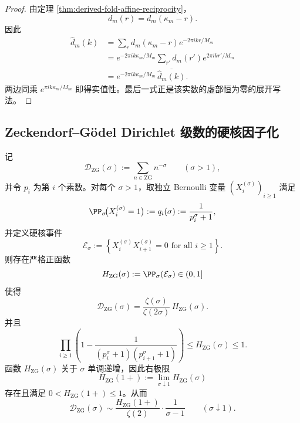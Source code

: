 \documentclass[../../../main.tex]{subfiles}
\begin{document}
\begin{proof}
由定理 \ref{thm:derived-fold-affine-reciprocity}，
\[
d_m(r)=d_m(\kappa_m-r).
\]
因此
\[
\begin{aligned}
\widehat d_m(k)
&=
\sum_{r}d_m(\kappa_m-r)e^{-2\pi i kr/M_m} \\
&=
e^{-2\pi i k\kappa_m/M_m}
\sum_{r'}d_m(r')e^{2\pi i kr'/M_m} \\
&=
e^{-2\pi i k\kappa_m/M_m}\,\overline{\widehat d_m(k)}.
\end{aligned}
\]
两边同乘 \(e^{\pi i k\kappa_m/M_m}\) 即得实值性。最后一式正是该实数的虚部恒为零的展开写法。
\end{proof}


\subsection{Zeckendorf--Gödel Dirichlet 级数的硬核因子化}

\begin{theorem}\label{thm:derived-zg-hardcore-factorization}
记
\[
\mathcal D_{\mathrm{ZG}}(\sigma):=\sum_{n\in \mathrm{ZG}}n^{-\sigma}
\qquad (\sigma>1),
\]
并令 \(p_i\) 为第 \(i\) 个素数。对每个 \(\sigma>1\)，取独立 Bernoulli 变量
\(
(X_i^{(\sigma)})_{i\ge 1}
\)
满足
\[
\PP_{\sigma}\!\bigl(X_i^{(\sigma)}=1\bigr)
:=
q_i(\sigma):=\frac{1}{p_i^{\sigma}+1},
\]
并定义硬核事件
\[
\mathcal E_{\sigma}:=
\left\{
X_i^{(\sigma)}X_{i+1}^{(\sigma)}=0
\text{ for all } i\ge 1
\right\}.
\]
则存在严格正函数
\[
H_{\mathrm{ZG}}(\sigma):=\PP_{\sigma}(\mathcal E_{\sigma})\in (0,1]
\]
使得
\[
\mathcal D_{\mathrm{ZG}}(\sigma)=\frac{\zeta(\sigma)}{\zeta(2\sigma)}\,H_{\mathrm{ZG}}(\sigma).
\]
并且
\[
\prod_{i\ge 1}
\left(
1-\frac{1}{(p_i^{\sigma}+1)(p_{i+1}^{\sigma}+1)}
\right)
\le H_{\mathrm{ZG}}(\sigma)\le 1.
\]
函数 \(H_{\mathrm{ZG}}(\sigma)\) 关于 \(\sigma\) 单调递增，因此右极限
\[
H_{\mathrm{ZG}}(1+):=\lim_{\sigma\downarrow 1}H_{\mathrm{ZG}}(\sigma)
\]
存在且满足 \(0<H_{\mathrm{ZG}}(1+)\le 1\)。从而
\[
\mathcal D_{\mathrm{ZG}}(\sigma)\sim
\frac{H_{\mathrm{ZG}}(1+)}{\zeta(2)}\cdot \frac{1}{\sigma-1}
\qquad (\sigma\downarrow 1).
\]
\end{theorem}
\end{document}
